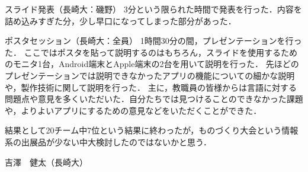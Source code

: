 スライド発表（長崎大：磯野）
3分という限られた時間で発表を行った．内容を詰め込みすぎた分，少し早口になってしまった部分があった．

ポスタセッション（長崎大：全員）
1時間30分の間，プレゼンテーションを行った．
ここではポスタを貼って説明するのはもちろん，スライドを使用するためのモニタ1台，Android端末とApple端末の2台を用いて説明を行った．
先ほどのプレゼンテーションでは説明できなかったアプリの機能についての細かな説明や，製作技術に関して説明を行った．
主に，教職員の皆様からは言語に対する問題点や意見を多くいただいた．自分たちでは見つけることのできなかった課題や，よりよいアプリにするための意見などをいただくことができた．

結果として20チーム中7位という結果に終わったが，ものづくり大会という情報系の出展品が少ない中大検討したのではないかと思う．

吉澤　健太（長崎大）

